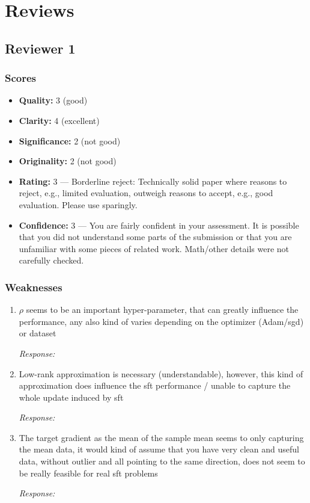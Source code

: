 \documentclass{article}
\newcommand{\score}[2]{\textbf{#1:} #2}
\newcommand{\response}[1][Response]{%
  \begin{answerbox}\textit{\small #1:}\end{answerbox}
}
\begin{document}
\section{Reviews}
\label{sec:reviews}

\subsection{Reviewer 1}
\label{sec:r1}

\subsubsection*{Scores}
\begin{itemize}[nosep]
    \item \score{Quality}{3 (good)}
    \item \score{Clarity}{4 (excellent)}
    \item \score{Significance}{2 (not good)}
    \item \score{Originality}{2 (not good)}
    \item \score{Rating}{3 --- Borderline reject: Technically solid paper where reasons to reject, e.g., limited evaluation, outweigh reasons to accept, e.g., good evaluation. Please use sparingly.}
    \item \score{Confidence}{3 --- You are fairly confident in your assessment. It is possible that you did not understand some parts of the submission or that you are unfamiliar with some pieces of related work. Math/other details were not carefully checked.}
\end{itemize}

\subsubsection*{Weaknesses}
\begin{enumerate}
    \item $\rho$ seems to be an important hyper-parameter, that can greatly influence the performance, any also kind of varies depending on the optimizer (Adam/sgd) or dataset
    \response
    \item Low-rank approximation is necessary (understandable), however, this kind of approximation does influence the sft performance / unable to capture the whole update induced by sft
    \response
    \item The target gradient as the mean of the sample mean seems to only capturing the mean data, it would kind of assume that you have very clean and useful data, without outlier and all pointing to the same direction, does not seem to be really feasible for real sft problems
    \response
\end{enumerate}
\end{document}

